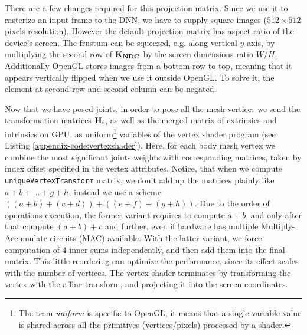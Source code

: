 There are a few changes required for this projection matrix. Since we use it to rasterize an input frame to the DNN, we have to supply square images ($512 \times 512$ pixels resolution). However the default projection matrix has aspect ratio of the device's screen. The frustum can be squeezed, e.g. along vertical $y$ axis, by multiplying the second row of $\bm{\mathrm{K_{NDC}}}$ by the screen dimensions ratio $W / H$. Additionally OpenGL stores images from a bottom row to top, meaning that it appears vertically flipped when we use it outside OpenGL. To solve it, the element at second row and second column can be negated.

Now that we have posed joints, in order to pose all the mesh vertices we send the transformation matrices $\bm{\mathrm{H}}_i$, as well as the merged matrix of extrinsics and intrinsics on GPU, as uniform\footnote{The term \textit{uniform} is specific to OpenGL, it means that a single variable value is shared across all the primitives (vertices/pixels) processed by a shader.} variables of the vertex shader program (see Listing \ref{appendix-code:vertexshader}). Here, for each body mesh vertex we combine the most significant joints weights with corresponding matrices, taken by index offset specified in the vertex attributes. Notice, that when we compute \verb|uniqueVertexTransform| matrix, we don't add up the matrices plainly like $a + b + ... + g + h$, instead we use a scheme $((a + b) + (c + d)) + ((e + f) + (g + h))$. Due to the order of operations execution, the former variant requires to compute $a + b$, and only after that compute $(a+b) + c$ and further, even if hardware has multiple Multiply-Accumulate circuits (MAC) available. With the latter variant, we force computation of 4 inner sums independently, and then add them into the final matrix. This little reordering can optimize the performance, since its effect scales with the number of vertices. The vertex shader terminates by transforming the vertex with the affine transform, and projecting it into the screen coordinates. 

